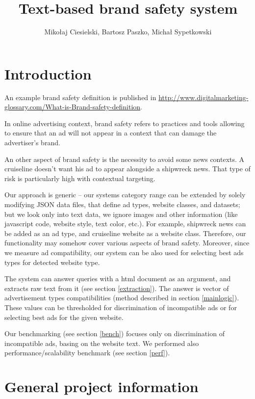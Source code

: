 \documentclass[a4paper]{article}
\begin{document}
\title{Text-based brand safety system}

\author{Mikołaj Ciesielski, Bartosz Paszko, Michał Sypetkowski}
\maketitle

\section{Introduction}

An example brand safety definition is published in
\url{http://www.digitalmarketing-glossary.com/What-is-Brand-safety-definition}.

In online advertising context,
brand safety refers to practices and tools allowing to ensure that
an ad will not appear in a context that can damage the advertiser’s brand.

An other aspect of brand safety is the necessity to avoid some news contexts.
A cruiseline doesn’t want his ad to appear alongside a shipwreck news.
That type of risk is particularly high with contextual targeting.

Our approach is generic -- our systems category range can be extended
by solely modifying JSON data files, that define ad types, website
classes, and datasets; but we look only into text data, we ignore images and other information
(like javascript code, website style, text color, etc.).
For example, shipwreck news can be added as an ad type,
and cruiseline website as a website class.
Therefore, our functionality may somehow cover various aspects of brand safety.
Moreover, since we measure ad compatibility, our system can be also used
for selecting best ads types for detected website type.

The system can answer queries with a html document as an argument,
and extracts raw text from it (see section \ref{extraction}).
The answer is vector of advertisement types compatibilities (method described in section \ref{mainlogic}).
These values can be thresholded for discrimination of incompatible
ads or for selecting best ads for the given website.

Our benchmarking (see section \ref{bench}) focuses only
on discrimination of incompatible ads, basing on the website text.
We performed also performance/scalability benchmark (see section \ref{perf}).



\section{General project information}
\end{document}
